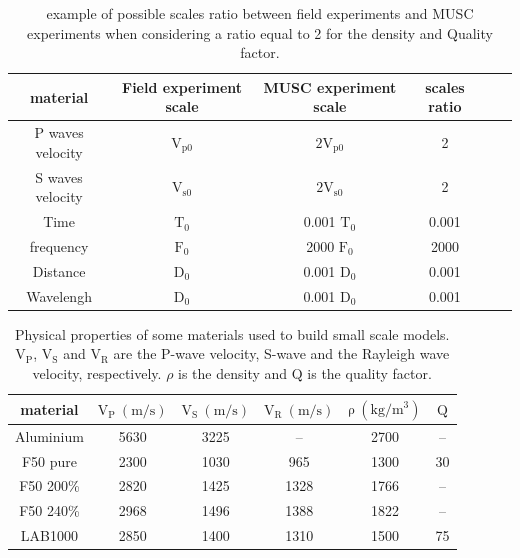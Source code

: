 \documentclass[manuscript,revised]{geophysics}
\begin{document}
\begin{table}[!ht]
	\centering
	\begin{tabular}{cccccc}
		\hline
		material & Field experiment scale & MUSC experiment scale & scales ratio  \\
		\hline
		P waves velocity & $\mathrm{V_{p 0}}$ & $\mathrm{2V_{p 0}}$  & 2  \\
		S waves velocity & $\mathrm{V_{s 0}}$ &  $\mathrm{2V_{s 0}}$ & 2   \\
		Time & $\mathrm{T_{0}}$    & 0.001 $\mathrm{T_{0}}$ & 0.001  \\
		frequency   & $\mathrm{F_{0}}$  & 2000 $\mathrm{F_{0}}$ & 2000  \\
		Distance   & $\mathrm{D_{0}}$  & 0.001 $\mathrm{D_{0}}$ & 0.001   \\
		Wavelengh   & $\mathrm{D_{0}}$ & 0.001 $\mathrm{D_{0}}$ & 0.001  \\
		\hline
	\end{tabular}
	\caption{ example of possible scales ratio between field experiments and MUSC experiments when considering a ratio equal to 2 for the density and Quality factor.}
	\label{epoxy-resin}
\end{table}


\begin{table}[!ht]
	\centering
	\begin{tabular}{cccccc}
		\hline
		material & $\mathrm{V_{P}\ (m/s)}$ & $\mathrm{V_{S}\ (m/s)}$ & $\mathrm{V_{R}\ (m/s)}$ & $\mathrm{\rho\ (kg/m^{3})}$ & $\mathrm{Q}$ \\
		\hline
		Aluminium & 5630 & 3225 & --   & 2700 & --  \\
		F50 pure  & 2300 & 1030 & 965  & 1300 & 30  \\
		F50 200\% & 2820 & 1425 & 1328 & 1766 & --  \\
		F50 240\% & 2968 & 1496 & 1388 & 1822 & --  \\
		LAB1000   & 2850 & 1400 & 1310 & 1500 & 75  \\
		\hline
	\end{tabular}
	\caption{Physical properties of some materials used to build small scale models. $\mathrm{V_{P}}$, $\mathrm{V_{S}}$ and $\mathrm{V_{R}}$ are the P-wave velocity, S-wave and the Rayleigh wave velocity, respectively. $\rho$ is the density and $\mathrm{Q}$ is the quality factor.}
	\label{epoxy-resin}
\end{table}
\end{document}
